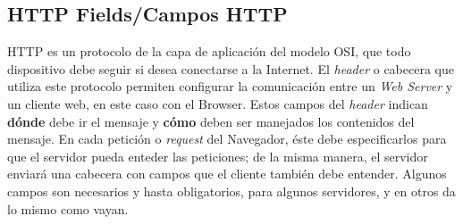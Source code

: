 \subsection{HTTP Fields/Campos HTTP}
    \label{chap2:headers}
    HTTP es un protocolo de la capa de aplicación del modelo OSI, que todo dispositivo debe seguir si desea conectarse a la Internet. El \textit{header} o cabecera que utiliza este protocolo permiten configurar la comunicación entre un \textit{Web Server} y un cliente web, en este caso con el Browser. Estos campos del \textit{header} indican \textbf{dónde} debe ir el mensaje y \textbf{cómo} deben ser manejados los contenidos del mensaje. En cada petición o \textit{request} del Navegador, éste debe especificarlos para que el servidor pueda enteder las peticiones; de la misma manera, el servidor enviará una cabecera con campos que el cliente también debe entender. Algunos campos son necesarios y hasta obligatorios, para algunos servidores, y en otros da lo mismo como vayan.


